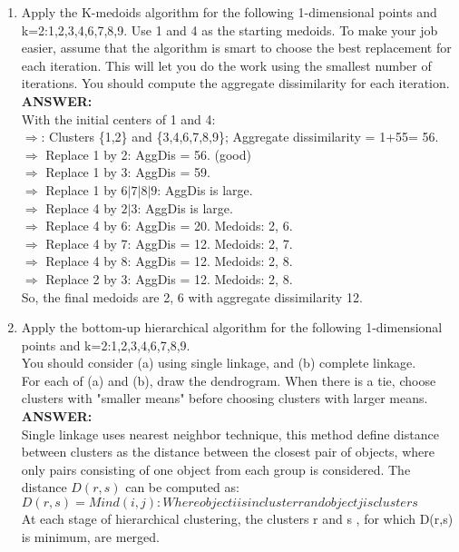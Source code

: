 \documentclass{article}
\begin{document}
\begin{enumerate}
\item Apply the K-medoids algorithm for the following 1-dimensional
  points and k=2:1,2,3,4,6,7,8,9. Use 1 and 4 as the starting medoids.
  To make your job easier, assume that the algorithm is smart to
  choose the best replacement for each iteration. This will let you do
  the work using the smallest number of iterations. You should compute
  the aggregate dissimilarity for each iteration.\\ 
\textbf{ANSWER:} \\
With the initial centers of 1 and 4: \\
$\Rightarrow$: Clusters \{1,2\} and \{3,4,6,7,8,9\}; Aggregate
dissimilarity = 1+55= 56. \\
$\Rightarrow$ Replace 1 by 2: AggDis = 56. (good)\\
$\Rightarrow$ Replace 1 by 3: AggDis = 59. \\
$\Rightarrow$ Replace 1 by $6|7|8|9$: AggDis is large. \\
$\Rightarrow$ Replace 4 by $2|3$: AggDis is large. \\
$\Rightarrow$ Replace 4 by 6: AggDis = 20. Medoids: 2, 6.\\
$\Rightarrow$ Replace 4 by 7: AggDis = 12. Medoids: 2, 7.\\
$\Rightarrow$ Replace 4 by 8: AggDis = 12. Medoids: 2, 8.\\
$\Rightarrow$ Replace 2 by 3: AggDis = 12. Medoids: 2, 8.\\

So, the final medoids are 2, 6 with aggregate dissimilarity 12. 

\item Apply the bottom-up hierarchical algorithm for the following
  1-dimensional points and k=2:1,2,3,4,6,7,8,9.\\
  You should consider (a) using single linkage, and (b) complete
  linkage.\\ 
  For each of (a) and (b), draw the dendrogram. When there is a tie,
  choose clusters with "smaller means" before choosing clusters with
  larger means. \\
\textbf{ANSWER:} \\
Single linkage uses nearest neighbor technique, this method define
distance between clusters as the distance between the closest pair of
objects, where only pairs consisting of one object from each group is
considered. The distance $D(r,s)$ can be computed as: \\
$D(r,s) = Min{d(i,j) : Where object i is in cluster r and object j is
 cluster s}$ \\
At each stage of hierarchical clustering, the clusters r and s , for
which D(r,s) is minimum, are merged.


\end{enumerate}
\end{document}
